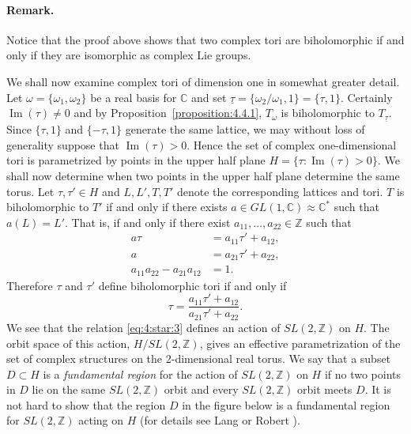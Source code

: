 \paragraph*{Remark.} Notice that the proof above shows that two complex tori are biholomorphic if and only if they are isomorphic as complex Lie groups.

We shall now examine complex tori of dimension one in somewhat greater detail.
Let $\omega=\{\omega_1,\omega_2\}$ be a real basis for $\mathbb C$ and set $\underline\tau=\{\omega_2/\omega_1,1\}=\{\tau,1\}$. Certainly $\operatorname{Im}(\tau)\neq0$ and by Proposition~\ref{proposition:4.4.1}, $T_\omega$ is biholomorphic to $T_{\underline\tau}$. Since $\{\tau,1\}$ and $\{-\tau,1\}$ generate the same lattice, we may without loss of generality suppose that $\operatorname{Im}(\tau)>0$. Hence the set of complex one-dimensional tori is parametrized by points in the upper half plane $H=\{\tau:\operatorname{Im}(\tau)>0\}$. We shall now determine when two points in the upper half plane determine the same torus. Let $\tau,\tau'\in H$ and $L,L',T,T'$ denote the corresponding lattices and tori. $T$ is biholomorphic to $T'$ if and only if there exists $a\in GL(1,\mathbb C)\approx\mathbb C^*$ such that $a(L)=L'$. That is, if and only if there exist $a_{11},\ldots,a_{22}\in\mathbb Z$ such that
\[
\begin{aligned}
a\tau&=a_{11}\tau'+a_{12},\\
a&=a_{21}\tau'+a_{22},\\
a_{11}a_{22}-a_{21}a_{12}&=1.
\end{aligned}
\]
Therefore $\tau$ and $\tau'$ define biholomorphic tori if and only if
\[
\tau=\frac{a_{11}\tau'+a_{12}}{a_{21}\tau'+a_{22}}.\tag{*}\label{eq:4:star:3}
\]
We see that the relation \eqref{eq:4:star:3} defines an action of $SL(2,\mathbb Z)$ on $H$. The orbit space of this action, $H/SL(2,\mathbb Z)$, gives an effective parametrization of the set of complex structures on the 2-dimensional real torus. We say that a subset $D\subset H$ is a \emph{fundamental region} for the action of $SL(2,\mathbb Z)$ on $H$ if no two points in $D$ lie on the same $SL(2,\mathbb Z)$ orbit and every $SL(2,\mathbb Z)$ orbit meets $D$. It is not hard to show that the region $D$ in the figure below is a fundamental region for $SL(2,\mathbb Z)$ acting on $H$ (for details see Lang \cite{bib:I:lang-s:2} or Robert \cite{bib:I:robert-a:1}).
